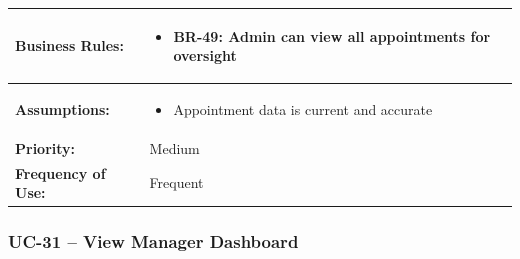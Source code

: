 \documentclass[12pt,a4paper]{article}
\begin{document}
\begin{longtable}{|p{4.5cm}|p{10.5cm}|}
\hline
\textbf{Business Rules:} &
\begin{itemize}
  \item BR-49: Admin can view all appointments for oversight
\end{itemize} \\
\hline
\textbf{Assumptions:} &
\begin{itemize}
  \item Appointment data is current and accurate
\end{itemize} \\
\hline
\textbf{Priority:} & Medium \\
\hline
\textbf{Frequency of Use:} & Frequent \\
\hline
\end{longtable}

\subsubsection{UC-31 – View Manager Dashboard}
\end{document}
